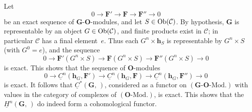 Let
\[
0 \longrightarrow \mathbf{F}' \longrightarrow \mathbf{F}
\longrightarrow \mathbf{F}'' \longrightarrow 0
\]
be an exact sequence of \(\mathbf{G}\)-\(\mathbf{O}\)-modules, and let
\(S \in \operatorname{Ob}(\mathcal{C})\). By hypothesis, \(\mathbf{G}\) is representable by
an object \(G \in \operatorname{Ob}(\mathcal{C})\), and finite products exist in
\(\mathcal{C}\); in particular \(\mathcal{C}\) has a final element~\(e\).
Thus each \(G^{n} \times \mathbf{h}_{S}\) is representable by \(G^{n} \times S\)
(with \(G^{0} = e\)), and the sequence
\[
0 \longrightarrow \mathbf{F}'(G^{n} \times S) \longrightarrow
\mathbf{F}(G^{n} \times S) \longrightarrow
\mathbf{F}''(G^{n} \times S) \longrightarrow 0
\]
is exact. This shows that the sequence of \(\mathbf{O}\)-modules
\[
0 \longrightarrow \underline{C}^{n}(\mathbf{h}_{G}, \mathbf{F}')
\longrightarrow \underline{C}^{n}(\mathbf{h}_{G}, \mathbf{F})
\longrightarrow \underline{C}^{n}(\mathbf{h}_{G}, \mathbf{F}'')
\longrightarrow 0
\]
is exact. It follows that \(\underline{C}^{*}(\mathbf{G},\,)\), considered as
a functor on \((\mathbf{G}\text{-}\mathbf{O}\text{-}\mathrm{Mod.})\) with
values in the category of complexes of
\((\mathbf{O}\text{-}\mathrm{Mod.})\), is exact. This shows that the
\(\underline{H}^{n}(\mathbf{G},\,)\) do indeed form a cohomological functor.
